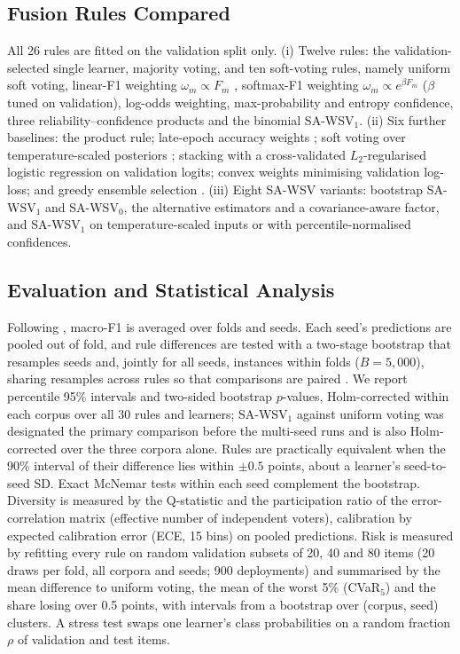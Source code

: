 \documentclass[conference,a4paper]{IEEEtran}
\newcommand{\rc}{SA\mbox{-}WSV}
\newcommand{\rcz}{SA\mbox{-}WSV$_0$}
\newcommand{\rco}{SA\mbox{-}WSV$_1$}
\begin{document}
\subsection{Fusion Rules Compared}
All 26 rules are fitted on the validation split only. (i) Twelve rules: the validation-selected single learner, majority voting, and ten soft-voting rules, namely uniform soft voting, linear-F1 weighting $\omega_m\propto F_m$ \cite{elgabry2026}, softmax-F1 weighting $\omega_m\propto e^{\beta F_m}$ ($\beta$ tuned on validation), log-odds weighting, max-probability and entropy confidence, three reliability--confidence products and the binomial \rco. (ii) Six further baselines: the product rule; late-epoch accuracy weights \cite{wu2026}; soft voting over temperature-scaled posteriors \cite{guo2017}; stacking with a cross-validated $L_2$-regularised logistic regression on validation logits; convex weights minimising validation log-loss; and greedy ensemble selection \cite{purucker2023}. (iii) Eight \rc{} variants: bootstrap \rco{} and \rcz, the alternative estimators and a covariance-aware factor, and \rco{} on temperature-scaled inputs or with percentile-normalised confidences.

\subsection{Evaluation and Statistical Analysis}
Following \cite{ulmer2022}, macro-F1 is averaged over folds and seeds. Each seed's predictions are pooled out of fold, and rule differences are tested with a two-stage bootstrap that resamples seeds and, jointly for all seeds, instances within folds ($B=5{,}000$), sharing resamples across rules so that comparisons are paired \cite{sellam2022}. We report percentile 95\% intervals and two-sided bootstrap $p$-values, Holm-corrected within each corpus over all 30 rules and learners; \rco{} against uniform voting was designated the primary comparison before the multi-seed runs and is also Holm-corrected over the three corpora alone. Rules are practically equivalent when the 90\% interval of their difference lies within $\pm0.5$ points, about a learner's seed-to-seed SD. Exact McNemar tests \cite{mcnemar1947} within each seed complement the bootstrap. Diversity is measured by the Q-statistic \cite{kuncheva2014} and the participation ratio of the error-correlation matrix (effective number of independent voters), calibration by expected calibration error (ECE, 15 bins) on pooled predictions. Risk is measured by refitting every rule on random validation subsets of 20, 40 and 80 items (20 draws per fold, all corpora and seeds; 900 deployments) and summarised by the mean difference to uniform voting, the mean of the worst 5\% (CVaR$_5$) and the share losing over 0.5 points, with intervals from a bootstrap over (corpus, seed) clusters. A stress test swaps one learner's class probabilities on a random fraction $\rho$ of validation and test items.
\end{document}
